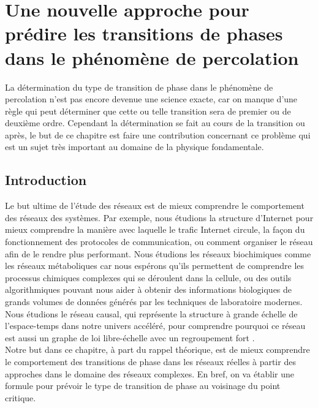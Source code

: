 \newcommand{\kma}{\textless k_a \textgreater}
\newcommand{\kmaa}{\textless k_a^2 \textgreater}
\chapter{Une nouvelle approche pour prédire les transitions de phases dans le phénomène de percolation}

La détermination du type de transition de phase dans le phénomène de percolation n'est pas encore devenue une science exacte, car on manque d'une règle qui  peut déterminer que cette ou telle transition sera de premier ou de deuxième ordre. Cependant la détermination se fait au cours de la transition ou après, le but de ce chapitre est  faire une contribution concernant ce problème qui est un sujet très important au domaine de la physique fondamentale.   


\section{Introduction}
Le but ultime de l'étude des réseaux est de mieux comprendre le comportement des réseaux des systèmes. Par exemple, nous étudions la structure d'Internet pour mieux comprendre la manière avec laquelle le trafic Internet  circule, la façon du fonctionnement des protocoles de communication, ou comment organiser le réseau afin de le rendre plus performant. Nous étudions les réseaux biochimiques comme les réseaux métaboliques car nous espérons qu'ils permettent de    comprendre les processus chimiques complexes qui se déroulent dans la cellule, ou des outils algorithmiques pouvant nous aider à obtenir des informations biologiques de grands volumes de données générés par les techniques de laboratoire modernes\cite{Newman2010}. Nous étudions le réseau causal, qui représente la structure à grande échelle de l'espace-temps dans notre univers accéléré, pour comprendre pourquoi ce réseau est aussi un graphe de loi libre-échelle avec un regroupement fort \cite{Sungryong-Arjun2015}.\\
Notre but dans ce chapitre, à part du rappel théorique, est de mieux comprendre le comportement des transitions de phase dans les réseaux réelles à partir
des approches dans le domaine des réseaux complexes. En bref, on va établir une formule pour prévoir le type de transition de phase au voisinage du point critique.

